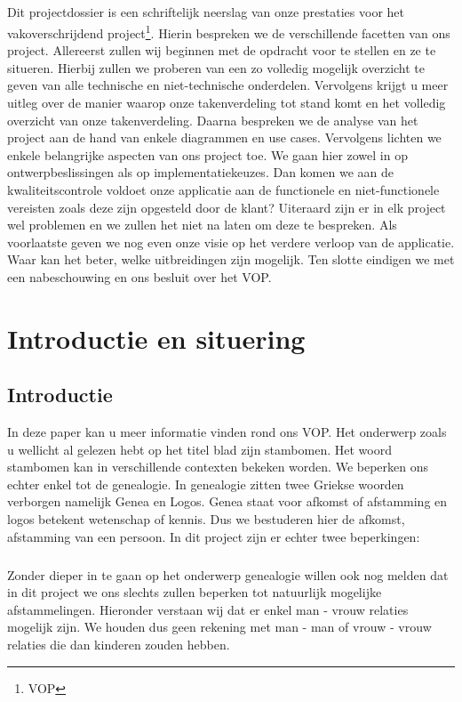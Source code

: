 \documentclass[pdftex,a4paper,12pt,twoside]{report}
\begin{document}
\paragraph{}
Dit projectdossier is een schriftelijk neerslag van onze prestaties voor het vakoverschrijdend project\footnote{VOP}. Hierin bespreken we de verschillende facetten van ons project. 
Allereerst zullen wij beginnen met de opdracht voor te stellen en ze te situeren. Hierbij zullen we proberen van een zo volledig mogelijk overzicht te geven van alle technische en niet-technische onderdelen. Vervolgens krijgt u meer uitleg over de manier waarop onze takenverdeling tot stand komt en het volledig overzicht van onze takenverdeling.
Daarna bespreken we de analyse van het project aan de hand van enkele diagrammen en use cases. Vervolgens lichten we enkele belangrijke aspecten van ons project toe. We gaan hier zowel in op ontwerpbeslissingen als op implementatiekeuzes. Dan komen we aan de kwaliteitscontrole voldoet onze applicatie aan de functionele en niet-functionele vereisten zoals deze zijn opgesteld door de klant? Uiteraard zijn er in elk project wel problemen en we zullen het niet na laten om deze te bespreken. Als voorlaatste geven we nog even onze visie op het verdere verloop van de applicatie. Waar kan het beter, welke uitbreidingen zijn mogelijk. Ten slotte eindigen we met een nabeschouwing en ons besluit over het VOP.
\chapter{Introductie en situering}\label{ch:introduction}

\section{Introductie}
In deze paper kan u meer informatie vinden rond ons VOP. Het onderwerp zoals u wellicht al gelezen hebt op het titel blad zijn stambomen. Het woord stambomen kan in verschillende contexten bekeken worden. We beperken ons echter enkel tot de genealogie. In genealogie zitten twee Griekse woorden verborgen namelijk Genea en Logos. Genea staat voor afkomst of afstamming en logos betekent wetenschap of kennis. 
Dus we bestuderen hier de afkomst, afstamming van een persoon.
In dit project zijn er echter twee beperkingen:
\paragraph{}
Zonder dieper in te gaan op het onderwerp genealogie willen ook nog melden dat in dit project we ons slechts zullen beperken tot natuurlijk mogelijke afstammelingen. Hieronder verstaan wij dat er enkel man - vrouw relaties mogelijk zijn. We houden dus geen rekening met man - man of vrouw - vrouw relaties die dan kinderen zouden hebben.
\end{document}
